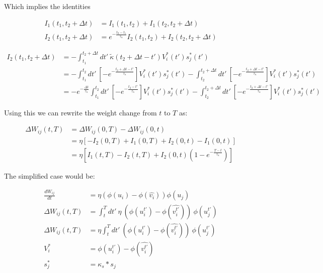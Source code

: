 \documentclass[12pt,a4paper,titlepage]{report}
\begin{document}
Which implies the identities

\begin{align*}
  I_1(t_1, t_2 + \Delta t) & = I_1 (t_1, t_2) + I_1 (t_2, t_2 + \Delta t)                                       \\
  I_2(t_1, t_2 + \Delta t) & = e^{- \frac{t_2 - t_1}{\tau_{\kappa}}} I_2 (t_1, t_2) + I_2 (t_2, t_2 + \Delta t)
\end{align*}


\begin{align}
  I_2 (t_1, t_2 + \Delta t) & = -\int_{t_1}^{t_2 + \Delta t} dt' \ \tilde{\kappa} (t_2 + \Delta t - t') V_i^\ast (t') s_j^\ast (t')                                        \\
                            & = -\int_{t_1}^{t_2} dt' \ \left[ -e^{- \frac{t_2 + \Delta t - t'}{\tau_\kappa}} \right] V_i^\ast (t') s_j^\ast (t')
  -\int_{t_2}^{t_2 + \Delta t} dt' \ \left[ -e^{- \frac{t_2 + \Delta t - t'}{\tau_\kappa}} \right] V_i^\ast (t') s_j^\ast (t')                                             \\
                            & = -e^{- \frac{ \Delta t}{\tau_\kappa}} \int_{t_1}^{t_2} dt' \ \left[ -e^{- \frac{t_2 - t'}{\tau_\kappa}} \right] V_i^\ast (t') s_j^\ast (t')
  -\int_{t_2}^{t_2 + \Delta t} dt' \ \left[ -e^{- \frac{t_2 + \Delta t - t'}{\tau_\kappa}} \right] V_i^\ast (t') s_j^\ast (t')
\end{align}


Using this we can rewrite the weight change from $t$ to $T$ as:


\begin{align*}
  \Delta W_{ij}(t,T) & = \Delta W_{ij}(0,T) - \Delta W_{ij}(0,t)                                               \\
                     & = \eta [-I_2(0,T) + I_1(0,T) + I_2(0,t) - I_1(0,t)]                                     \\
                     & = \eta [I_1(t,T) - I_2(t,T) + I_2(0,t)\left( 1 - e^{- \frac{T-t}{\tau_\kappa}} \right)]
\end{align*}

The simplified \cite{sacramento2018dendritic} case would be:

\begin{align*}
  \frac{dW_{ij}}{dt} & = \eta (\phi(u_i) - \phi(\hat{v_i})) \phi(u_j)                                         \\
  \Delta W_{ij}(t,T) & = \int_t^T dt' \ \eta \  (\phi(u_i^{t'}) - \phi(\widehat{v_i^{t'}})) \  \phi(u_j^{t'}) \\
  \Delta W_{ij}(t,T) & = \eta \int_t^T dt' \  (\phi(u_i^{t'}) - \phi(\widehat{v_i^{t'}})) \ \phi(u_j^{t'})    \\
  V_i^*              & = \phi(u_i^{t'}) - \phi(\widehat{v_i^{t'}})                                            \\
  s_j^*              & = \kappa_s * s_j
\end{align*}
\end{document}
